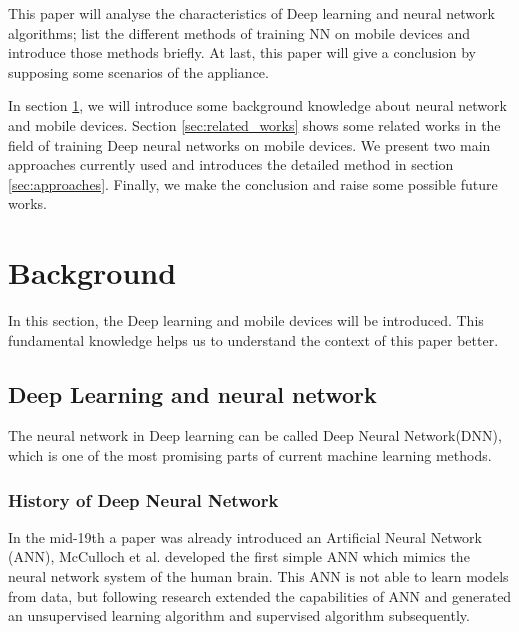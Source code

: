 \documentclass[article]{aaltoseries}
\begin{document}
This paper will analyse the characteristics of Deep learning and neural network algorithms;
list the different methods of training NN on mobile devices and introduce those methods briefly. 
At last, this paper will give a conclusion by supposing some scenarios of the appliance.


In section \ref{sec:background}, we will introduce some background knowledge about neural network and mobile devices.
Section \ref{sec:related_works} shows some related works in the field of training Deep neural networks on mobile devices.
We present two main approaches currently used and introduces the detailed method in section \ref{sec:approaches}.
Finally, we make the conclusion and raise some possible future works.







\section{Background}
\label{sec:background}

In this section, the Deep learning and mobile devices will be introduced. This fundamental 
knowledge helps us to understand the context of this paper better.




\subsection{Deep Learning and neural network}

The neural network in Deep learning can be called Deep Neural Network(DNN), which is one of the most promising 
parts of current machine learning methods. 

\subsubsection{History of Deep Neural Network}

In the mid-19th a paper was already introduced an Artificial Neural Network (ANN)\cite{Warren1943}, 
McCulloch et al. developed the first simple ANN which mimics the neural network system of the human brain. This ANN is not
able to learn models from data, but following research extended the capabilities of ANN and generated an unsupervised 
learning algorithm and supervised algorithm subsequently.
\end{document}
